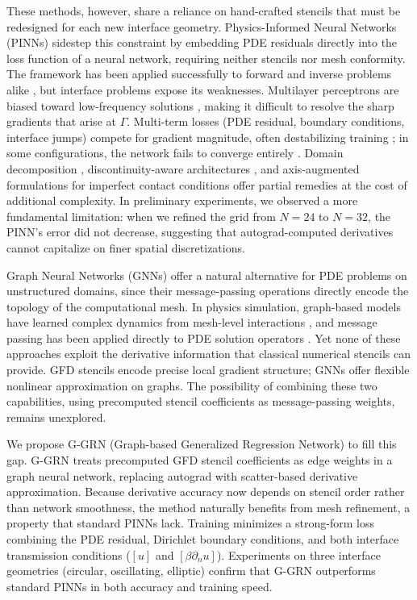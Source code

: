\documentclass[11pt]{article}
\theoremstyle{definition}
\theoremstyle{remark}
\theoremstyle{plain}
\begin{document}
These methods, however, share a reliance on hand-crafted stencils that must be redesigned for each new interface geometry. Physics-Informed Neural Networks (PINNs) \citep{raissi2019physics} sidestep this constraint by embedding PDE residuals directly into the loss function of a neural network, requiring neither stencils nor mesh conformity. The framework has been applied successfully to forward and inverse problems alike \citep{karniadakis2021physics, lu2021deepxde}, but interface problems expose its weaknesses. Multilayer perceptrons are biased toward low-frequency solutions \cite{rahaman2019spectral}, making it difficult to resolve the sharp gradients that arise at $\Gamma$. Multi-term losses (PDE residual, boundary conditions, interface jumps) compete for gradient magnitude, often destabilizing training \cite{wang2021understanding}; in some configurations, the network fails to converge entirely \cite{krishnapriyan2021characterizing}. Domain decomposition \cite{jagtap2020conservative}, discontinuity-aware architectures \cite{hu2022discontinuity}, and axis-augmented formulations for imperfect contact conditions \cite{oh2025physics} offer partial remedies at the cost of additional complexity. In preliminary experiments, we observed a more fundamental limitation: when we refined the grid from $N=24$ to $N=32$, the PINN's error did not decrease, suggesting that autograd-computed derivatives cannot capitalize on finer spatial discretizations.

Graph Neural Networks (GNNs) \cite{kipf2016semi, hamilton2017inductive} offer a natural alternative for PDE problems on unstructured domains, since their message-passing operations \cite{gilmer2017neural} directly encode the topology of the computational mesh. In physics simulation, graph-based models have learned complex dynamics from mesh-level interactions \cite{sanchez2020learning, pfaff2020learning}, and message passing has been applied directly to PDE solution operators \cite{brandstetter2022message}. Yet none of these approaches exploit the derivative information that classical numerical stencils can provide. GFD stencils encode precise local gradient structure; GNNs offer flexible nonlinear approximation on graphs. The possibility of combining these two capabilities, using precomputed stencil coefficients as message-passing weights, remains unexplored.

We propose G-GRN (Graph-based Generalized Regression Network) to fill this gap. G-GRN treats precomputed GFD stencil coefficients as edge weights in a graph neural network, replacing autograd with scatter-based derivative approximation. Because derivative accuracy now depends on stencil order rather than network smoothness, the method naturally benefits from mesh refinement, a property that standard PINNs lack. Training minimizes a strong-form loss combining the PDE residual, Dirichlet boundary conditions, and both interface transmission conditions ($[u]$ and $[\beta\partial_n u]$). Experiments on three interface geometries (circular, oscillating, elliptic) confirm that G-GRN outperforms standard PINNs in both accuracy and training speed.
\end{document}
